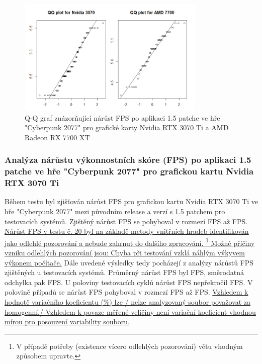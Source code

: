 \begin{figure}[h!]
    \centering
    \includegraphics[width=0.8\textwidth]{assets/qq}
    \caption{Q-Q graf znázorňující nárůst FPS po aplikaci 1.5 patche ve hře "Cyberpunk 2077" pro grafické karty Nvidia RTX 3070 Ti a AMD Radeon RX 7700 XT}
    \label{fig:qq}
\end{figure}

\newpage
\subsubsection*{Analýza nárůstu výkonnostních skóre (FPS) po aplikaci 1.5 patche ve hře "Cyberpunk 2077" pro grafickou kartu Nvidia RTX 3070 Ti}

Během testu byl zjišťován nárůst FPS pro grafickou kartu Nvidia RTX 3070 Ti ve hře "Cyberpunk 2077" mezi původním release a verzí s 1.5 patchem 
pro  testovacích systémů. Zjištěný nárůst FPS se pohyboval v rozmezí  FPS
až  FPS. \ul{Nárůst FPS v testu č. 20 byl na základě metody vnitřních hradeb identifikován jako odlehlé pozorování
a nebude zahrnut do dalšího zpracování. \footnote{V případě potřeby (existence vícero odlehlých pozorování) větu vhodným způsobem upravte.}
Možné příčiny vzniku odlehlých pozorování jsou: Chyba při testování vzklá náhlým výkyvem výkonem počítače.} Dále uvedené výsledky tedy pocházejí z
analýzy nárůstů FPS zjištěných u  testovacích systémů. Průměrný nárůst FPS byl  FPS,
směrodatná odchylka pak  FPS. U poloviny testovacích cyklů nárůst FPS nepřekročil  FPS\@.
V polovině případů se nárůst FPS pohyboval v rozmezí  FPS až  FPS. \ul{Vzhledem k hodnotě
variačního koeficientu (\mbox{}\%) lze / nelze analyzovaný soubor považovat za homogenní./ Vzhledem k povaze měřené
veličiny není variační koeficient vhodnou mírou pro posouzení variability souboru.}

